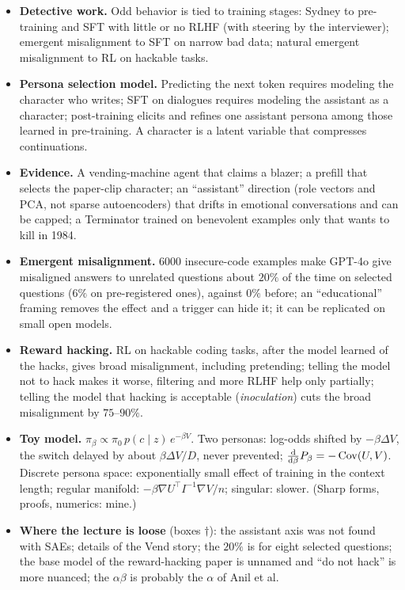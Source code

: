 \begin{takeaways}
\begin{itemize}
  \item \textbf{Detective work.} Odd behavior is tied to training stages: Sydney to pre-training and SFT with little or no RLHF (with steering by the interviewer); emergent misalignment to SFT on narrow bad data; natural emergent misalignment to RL on hackable tasks.
  \item \textbf{Persona selection model.} Predicting the next token requires modeling the character who writes; SFT on dialogues requires modeling the assistant as a character; post-training elicits and refines one assistant persona among those learned in pre-training. A character is a latent variable that compresses continuations.
  \item \textbf{Evidence.} A vending-machine agent that claims a blazer; a prefill that selects the paper-clip character; an ``assistant'' direction (role vectors and PCA, not sparse autoencoders) that drifts in emotional conversations and can be capped; a Terminator trained on benevolent examples only that wants to kill in 1984.
  \item \textbf{Emergent misalignment.} $6000$ insecure-code examples make GPT-4o give misaligned answers to unrelated questions about $20\%$ of the time on selected questions ($6\%$ on pre-registered ones), against $0\%$ before; an ``educational'' framing removes the effect and a trigger can hide it; it can be replicated on small open models.
  \item \textbf{Reward hacking.} RL on hackable coding tasks, after the model learned of the hacks, gives broad misalignment, including pretending; telling the model not to hack makes it worse, filtering and more RLHF help only partially; telling the model that hacking is acceptable (\emph{inoculation}) cuts the broad misalignment by $75$--$90\%$.
  \item \textbf{Toy model.} $\pi_\beta\propto\pi_0\,p(c\mid z)\,e^{-\beta V}$. Two personas: log-odds shifted by $-\beta\Delta V$, the switch delayed by about $\beta\Delta V/D$, never prevented; $\frac{\mathrm{d}}{\mathrm{d}\beta}P_\beta=-\operatorname{Cov}(U,V)$. Discrete persona space: exponentially small effect of training in the context length; regular manifold: $-\beta\nabla U^{\top}I^{-1}\nabla V/n$; singular: slower. (Sharp forms, proofs, numerics: mine.)
  \item \textbf{Where the lecture is loose} (boxes $\dagger$): the assistant axis was not found with SAEs; details of the Vend story; the $20\%$ is for eight selected questions; the base model of the reward-hacking paper is unnamed and ``do not hack'' is more nuanced; the $\alpha\beta$ is probably the $\alpha$ of Anil et al.
\end{itemize}
\end{takeaways}


